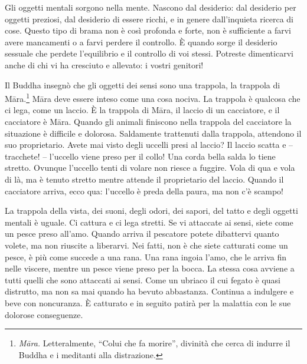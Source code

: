 Gli oggetti mentali sorgono nella mente. Nascono dal desiderio: dal
desiderio per oggetti preziosi, dal desiderio di essere ricchi, e in
genere dall'inquieta ricerca di cose. Questo tipo di brama non è così
profonda e forte, non è sufficiente a farvi avere mancamenti o a farvi
perdere il controllo. È quando sorge il desiderio sessuale che perdete
l'equilibrio e il controllo di voi stessi. Potreste dimenticarvi anche
di chi vi ha cresciuto e allevato: i vostri genitori!

Il Buddha insegnò che gli oggetti dei sensi sono una trappola, la
trappola di Māra.\footnote{\emph{Māra.} Letteralmente, ``Colui che fa morire'',
  divinità che cerca di indurre il Buddha e i meditanti alla
  distrazione.} Māra deve essere inteso come una cosa nociva. La
trappola è qualcosa che ci lega, come un laccio. È la trappola di Māra,
il laccio di un cacciatore, e il cacciatore è Māra. Quando gli animali
finiscono nella trappola del cacciatore la situazione è difficile e
dolorosa. Saldamente trattenuti dalla trappola, attendono il suo
proprietario. Avete mai visto degli uccelli presi al laccio? Il laccio
scatta e -- tracchete! -- l'uccello viene preso per il collo! Una corda
bella salda lo tiene stretto. Ovunque l'uccello tenti di volare non
riesce a fuggire. Vola di qua e vola di là, ma è tenuto stretto mentre
attende il proprietario del laccio. Quando il cacciatore arriva, ecco
qua: l'uccello è preda della paura, ma non c'è scampo!

La trappola della vista, dei suoni, degli odori, dei sapori, del tatto e
degli oggetti mentali è uguale. Ci cattura e ci lega stretti. Se vi
attaccate ai sensi, siete come un pesce preso all'amo. Quando arriva il
pescatore potete dibattervi quanto volete, ma non riuscite a liberarvi.
Nei fatti, non è che siete catturati come un pesce, è più come succede a
una rana. Una rana ingoia l'amo, che le arriva fin nelle viscere, mentre
un pesce viene preso per la bocca. La stessa cosa avviene a tutti quelli
che sono attaccati ai sensi. Come un ubriaco il cui fegato è quasi
distrutto, ma non sa mai quando ha bevuto abbastanza. Continua a
indulgere e beve con noncuranza. È catturato e in seguito patirà per la
malattia con le sue dolorose conseguenze.

